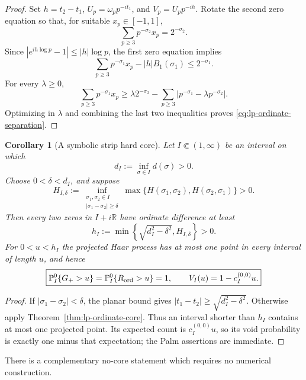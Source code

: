 \documentclass[11pt]{article}
\newtheorem{corollary}[theorem]{Corollary}
\theoremstyle{definition}
\theoremstyle{remark}
\newcommand{\R}{\mathbb R}
\begin{document}
\begin{proof}
Set $h=t_2-t_1$, $U_p=\omega_pp^{-it_1}$, and $V_p=U_pp^{-ih}$.  Rotate the
second zero equation so that, for suitable $x_p\in[-1,1]$,
\[
 \sum_{p\geq3}p^{-\sigma_2}x_p=2^{-\sigma_2}.
\]
Since $|e^{ih\log p}-1|\leq|h|\log p$, the first zero equation implies
\[
 \sum_{p\geq3}p^{-\sigma_1}x_p-|h|B_1(\sigma_1)
 \leq2^{-\sigma_1}.
\]
For every $\lambda\geq0$,
\[
 \sum_{p\geq3}p^{-\sigma_1}x_p
 \geq\lambda2^{-\sigma_2}
      -\sum_{p\geq3}|p^{-\sigma_1}-\lambda p^{-\sigma_2}|.
\]
Optimizing in $\lambda$ and combining the last two inequalities proves
\eqref{eq:lp-ordinate-separation}.
\end{proof}

\begin{corollary}[A symbolic strip hard core]
\label{cor:lp-symbolic-strip-core}
Let $I\Subset(1,\infty)$ be an interval on which
\[
 d_I:=\inf_{\sigma\in I}d(\sigma)>0.
\]
Choose $0<\delta<d_I$, and suppose
\[
 H_{I,\delta}:=
 \inf_{\substack{\sigma_1,\sigma_2\in I\\
                  |\sigma_1-\sigma_2|\geq\delta}}
 \max\{H(\sigma_1,\sigma_2),H(\sigma_2,\sigma_1)\}>0.
\]
Then every two zeros in $I+i\R$ have ordinate difference at least
\begin{equation}
 h_I:=\min\left\{\sqrt{d_I^2-\delta^2},H_{I,\delta}\right\}>0.
 \label{eq:lp-strip-hcore}
\end{equation}
For $0<u<h_I$ the projected Haar process has at most one point in every
interval of length $u$, and hence
\begin{equation}
 \boxed{
 {\mathbb P}_I^0\{G_+>u\}
 ={\mathbb P}_I^0\{R_{\rm ord}>u\}=1,
 \qquad
 V_I(u)=1-c_I^{(0,0)}u.
 }
 \label{eq:lp-exact-core-laws}
\end{equation}
\end{corollary}

\begin{proof}
If $|\sigma_1-\sigma_2|<\delta$, the planar bound gives
$|t_1-t_2|\geq\sqrt{d_I^2-\delta^2}$.  Otherwise apply
Theorem~\ref{thm:lp-ordinate-core}.  Thus an interval shorter than $h_I$
contains at most one projected point.  Its expected count is
$c_I^{(0,0)}u$, so its void probability is exactly one minus that expectation;
the Palm assertions are immediate.
\end{proof}

There is a complementary no-core statement which requires no numerical
construction.
\end{document}
